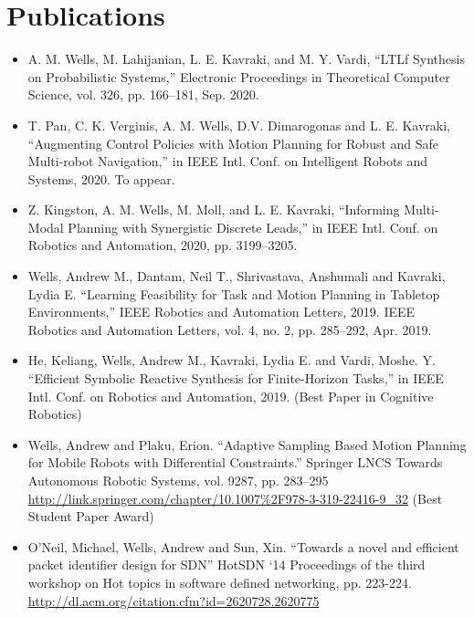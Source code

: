 \documentclass[11pt,a4paper,sans]{moderncv}        %
\begin{document}
\section{Publications}

\vspace{6pt}

\begin{itemize}

\item{A. M. Wells, M. Lahijanian, L. E. Kavraki, and M. Y. Vardi, “LTLf Synthesis on Probabilistic Systems,” Electronic Proceedings in Theoretical Computer Science, vol. 326, pp. 166–181, Sep. 2020.}

\item{T. Pan, C. K. Verginis, A. M. Wells, D.V. Dimarogonas and L. E. Kavraki, “Augmenting Control Policies with Motion Planning for Robust and Safe Multi-robot Navigation,” in IEEE Intl. Conf. on Intelligent Robots and Systems, 2020. To appear.}

\item{Z. Kingston, A. M. Wells, M. Moll, and L. E. Kavraki, “Informing Multi-Modal Planning with Synergistic Discrete Leads,” in IEEE Intl. Conf. on Robotics and Automation, 2020, pp. 3199–3205.}

\item{Wells, Andrew M., Dantam, Neil T., Shrivastava, Anshumali and Kavraki, Lydia E.  “Learning Feasibility for Task and Motion Planning in Tabletop Environments,” IEEE Robotics and Automation Letters, 2019. IEEE Robotics and Automation Letters, vol. 4, no. 2, pp. 285–292, Apr. 2019.}

\item{He, Keliang, Wells, Andrew M., Kavraki, Lydia E. and Vardi, Moshe. Y.  “Efficient Symbolic Reactive Synthesis for Finite-Horizon Tasks,” in IEEE Intl. Conf. on Robotics and Automation, 2019. (Best Paper in Cognitive Robotics)}

\item{Wells, Andrew and Plaku, Erion.  “Adaptive Sampling Based Motion Planning for Mobile Robots with Differential Constraints.” Springer LNCS Towards Autonomous Robotic Systems, vol. 9287, pp. 283–295 \url{http://link.springer.com/chapter/10.1007%2F978-3-319-22416-9_32} (Best Student Paper Award)}

\item{O’Neil, Michael, Wells, Andrew and Sun, Xin. “Towards a novel and efficient packet identifier design for SDN” HotSDN ‘14 Proceedings of the third workshop on Hot topics in software defined networking, pp. 223-224. \url{http://dl.acm.org/citation.cfm?id=2620728.2620775}}

\end{itemize}
\end{document}
